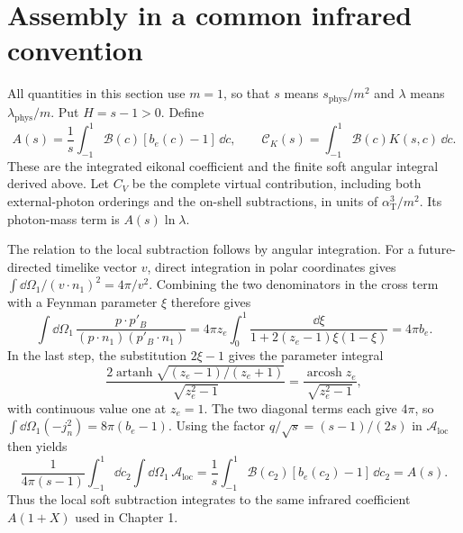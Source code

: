 \section{Assembly in a common infrared convention}
All quantities in this section use $m=1$, so that $s$ means
$s_{\mathrm{phys}}/m^2$ and $\lambda$ means
$\lambda_{\mathrm{phys}}/m$. Put $H=s-1>0$. Define
\begin{equation}
 A(s)=\frac1s\int_{-1}^1\mathcal B(c)[b_e(c)-1]\,\dd c,
 \qquad \mathcal C_K(s)=\int_{-1}^1\mathcal B(c)K(s,c)\,\dd c.
\end{equation}
These are the integrated eikonal coefficient and the finite soft
angular integral derived above. Let $C_V$ be the complete virtual
contribution, including both external-photon orderings and the
on-shell subtractions, in units of $\alpha_{\mathrm T}^3/m^2$.
Its photon-mass term is $A(s)\ln\lambda$.

The relation to the local subtraction follows by angular integration.
For a future-directed timelike vector $v$, direct integration in polar
coordinates gives $\int\dd\Omega_1/(v\cdot n_1)^2=4\pi/v^2$.
Combining the two denominators in the cross term with a Feynman
parameter $\xi$ therefore gives
\begin{equation}
 \int\dd\Omega_1\,\frac{p\cdot p'_B}
 {(p\cdot n_1)(p'_B\cdot n_1)}
 =4\pi z_e\int_0^1\frac{\dd\xi}
 {1+2(z_e-1)\xi(1-\xi)}=4\pi b_e.
\end{equation}
In the last step, the substitution $2\xi-1$ gives the parameter integral
\begin{equation}
 \frac{2\operatorname{artanh}\sqrt{(z_e-1)/(z_e+1)}}{\sqrt{z_e^2-1}}
 =\frac{\operatorname{arcosh}z_e}{\sqrt{z_e^2-1}},
\end{equation}
with continuous value one at $z_e=1$.
The two diagonal terms each give $4\pi$, so
$\int\dd\Omega_1(-j_n^2)=8\pi(b_e-1)$. Using the factor
$q/\sqrt{s}=(s-1)/(2s)$ in $\mathcal A_{\mathrm{loc}}$ then yields
\begin{equation}
 \frac1{4\pi(s-1)}\int_{-1}^1\dd c_2\int\dd\Omega_1\,
 \mathcal A_{\mathrm{loc}}
 =\frac1s\int_{-1}^1\mathcal B(c_2)[b_e(c_2)-1]\,\dd c_2=A(s).
\end{equation}
Thus the local soft subtraction integrates to the same infrared
coefficient $A(1+X)$ used in Chapter 1.

